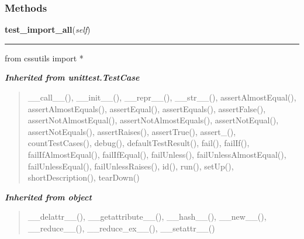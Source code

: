 
  \subsubsection{Methods}

    \label{cssutils:tests:test_cssutilsimport:CSSutilsImportTestCase:test_import_all}

    \vspace{0.5ex}

\hspace{.8\funcindent}\begin{boxedminipage}{\funcwidth}

    \raggedright \textbf{test\_import\_all}(\textit{self})

    \vspace{-1.5ex}

    \rule{\textwidth}{0.5\fboxrule}
\setlength{\parskip}{2ex}
    from cssutils import *

\setlength{\parskip}{1ex}
    \end{boxedminipage}


\large{\textbf{\textit{Inherited from unittest.TestCase}}}

\begin{quote}
\_\_call\_\_(), \_\_init\_\_(), \_\_repr\_\_(), \_\_str\_\_(), assertAlmostEqual(), assertAlmostEquals(), assertEqual(), assertEquals(), assertFalse(), assertNotAlmostEqual(), assertNotAlmostEquals(), assertNotEqual(), assertNotEquals(), assertRaises(), assertTrue(), assert\_(), countTestCases(), debug(), defaultTestResult(), fail(), failIf(), failIfAlmostEqual(), failIfEqual(), failUnless(), failUnlessAlmostEqual(), failUnlessEqual(), failUnlessRaises(), id(), run(), setUp(), shortDescription(), tearDown()
\end{quote}

\large{\textbf{\textit{Inherited from object}}}

\begin{quote}
\_\_delattr\_\_(), \_\_getattribute\_\_(), \_\_hash\_\_(), \_\_new\_\_(), \_\_reduce\_\_(), \_\_reduce\_ex\_\_(), \_\_setattr\_\_()
\end{quote}

